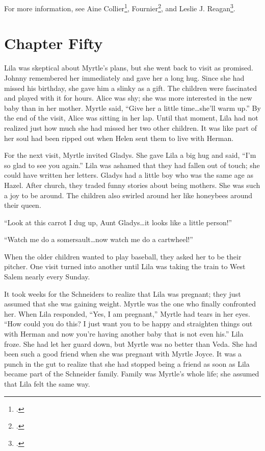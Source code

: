 \documentclass[
  letterpaper,
]{book}
\begin{document}
For more information, see Aine Collier\footnote{.},
Fournier\footnote{.}, and
Leslie J. Reagan\footnote{.}.


\chapter{Chapter Fifty}\label{chapter-fifty}

Lila was skeptical about Myrtle's plans, but she went back to visit as
promised. Johnny remembered her immediately and gave her a long hug.
Since she had missed his birthday, she gave him a slinky as a gift. The
children were fascinated and played with it for hours. Alice was shy;
she was more interested in the new baby than in her mother. Myrtle said,
``Give her a little time\ldots she'll warm up.'' By the end of the
visit, Alice was sitting in her lap. Until that moment, Lila had not
realized just how much she had missed her two other children. It was
like part of her soul had been ripped out when Helen sent them to live
with Herman.

For the next visit, Myrtle invited Gladys. She gave Lila a big hug and
said, ``I'm so glad to see you again.'' Lila was ashamed that they had
fallen out of touch; she could have written her letters. Gladys had a
little boy who was the same age as Hazel. After church, they traded
funny stories about being mothers. She was such a joy to be around. The
children also swirled around her like honeybees around their queen.

``Look at this carrot I dug up, Aunt Gladys\ldots it looks like a little
person!''

``Watch me do a somersault\ldots now watch me do a cartwheel!''

When the older children wanted to play baseball, they asked her to be
their pitcher. One visit turned into another until Lila was taking the
train to West Salem nearly every Sunday.

It took weeks for the Schneiders to realize that Lila was pregnant; they
just assumed that she was gaining weight. Myrtle was the one who finally
confronted her. When Lila responded, ``Yes, I am pregnant,'' Myrtle had
tears in her eyes. ``How could you do this? I just want you to be happy
and straighten things out with Herman and now you're having another baby
that is not even his.'' Lila froze. She had let her guard down, but
Myrtle was no better than Veda. She had been such a good friend when she
was pregnant with Myrtle Joyce. It was a punch in the gut to realize
that she had stopped being a friend as soon as Lila became part of the
Schneider family. Family was Myrtle's whole life; she assumed that Lila
felt the same way.
\end{document}

